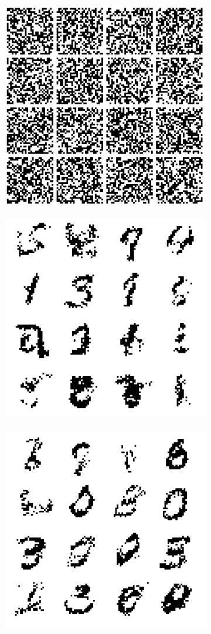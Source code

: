 \documentclass{article}
\begin{document}
\begin{figure}[t]
\begin{subfigure}{0.32\textwidth}
\centering
\includegraphics[scale=0.3]{img/vae_sample_0}
\end{subfigure}
\begin{subfigure}{0.32\textwidth}
\centering
\includegraphics[scale=0.3]{img/vae_sample_20}
\end{subfigure}
\begin{subfigure}{0.32\textwidth}
\centering
\includegraphics[scale=0.3]{img/vae_sample_40}

\end{subfigure}
\end{figure}
\end{document}
